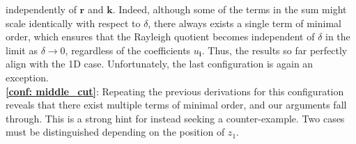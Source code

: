 \documentclass{article}
\numberwithin{equation}{section}
\theoremstyle{definition}
\begin{document}
independently of $\bm{r}$ and $\bm{k}$. Indeed, although some of the terms in the sum might scale identically with respect to $\delta$, there always exists a single term of minimal order, which ensures that the Rayleigh quotient becomes independent of $\delta$ in the limit as $\delta \to 0$, regardless of the coefficients $u_{\bm{i}}$. Thus, the results so far perfectly align with the 1D case. Unfortunately, the last configuration is again an exception. \\

\noindent \textbf{\ref{conf: middle_cut}}:
Repeating the previous derivations for this configuration reveals that there exist multiple terms of minimal order, and our arguments fall through. This is a strong hint for instead seeking a counter-example. Two cases must be distinguished depending on the position of $z_1$. 
\end{document}
